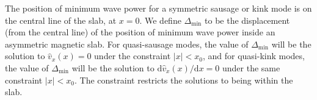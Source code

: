 \documentclass[namedreferences]{solarphysics}
\numberwithin{equation}{section}
\begin{document}
\begin{article}
The position of minimum wave power for a symmetric sausage or kink mode is on the central line of the slab, at $x=0$. We define $\Delta_\textrm{min}$ to be the displacement (from the central line) of the position of minimum wave power inside an asymmetric magnetic slab. For quasi-sausage modes, the value of $\Delta_\textrm{min}$ will be the solution to $\widehat{v}_x(x) = 0$ under the constraint $|x| < x_0$, and for quasi-kink modes, the value of $\Delta_\textrm{min}$ will be the solution to $\textrm{d}\widehat{v}_x (x) / \textrm{d}x = 0$ under the same constraint $|x| < x_0$. The constraint restricts the solutions to being within the slab. 

\begin{figure}
\end{figure}
\end{article}
\end{document}
